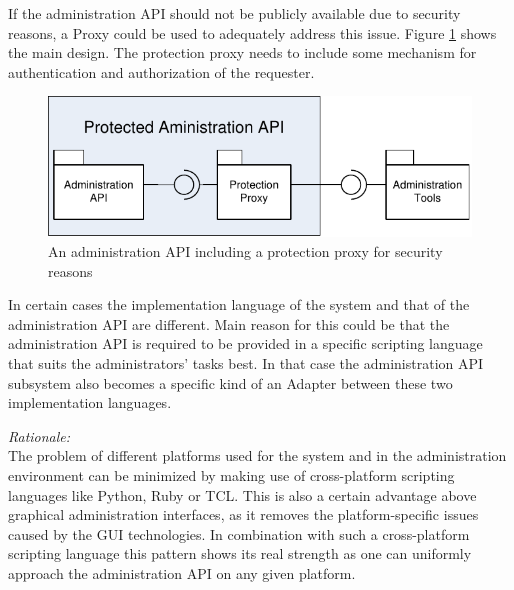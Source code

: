 If the administration API should not be publicly available due to security reasons, a {\sc Proxy} \cite{Buschmann1996} could be used to adequately address this issue. Figure \ref{fig:provideAPIDiagram-02} shows the main design. The protection proxy needs to include some mechanism for authentication and authorization of the requester.


\begin{figure}[h]
\centering
\includegraphics{patterns/provideAPIDiagram-02.pdf}
\caption{An administration API including a protection proxy for security reasons}
\label{fig:provideAPIDiagram-02}
\end{figure}

In certain cases the implementation language of the system and that of the administration API are different. Main reason for this could be that the administration API is required to be provided in a specific scripting language that suits the administrators' tasks best. In that case the administration API subsystem also becomes a specific kind of an {\sc Adapter} \cite{Gamma95} between these two implementation languages.

\begin{center}
   
\end{center}

\textit{Rationale:}\\
The problem of different platforms used for the system and in the administration environment can be minimized by making use of cross-platform scripting languages like Python, Ruby or TCL. This is also a certain advantage above graphical administration interfaces, as it removes the platform-specific issues caused by the GUI technologies. In combination with such a cross-platform scripting language this pattern shows its real strength as one can uniformly approach the administration API on any given platform.

